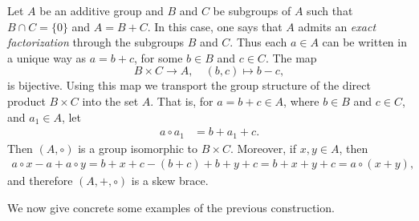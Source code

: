 \begin{example}
    \label{exa:WX}
    Let $A$ be an additive group
	and $B$ and $C$ be subgroups of $A$ such that $B\cap C=\{ 0\}$ and $A=B+C$. In this case, one says that $A$ admits an {\em exact factorization} through the subgroups $B$ and $C$.  Thus each $a\in A$ can be written in a unique
	way as $a=b+c$, for some $b\in B$ and $c\in C$.  The map
	\[
		B\times C\to A,\quad
		(b,c)\mapsto b-c,
	\]
	is bijective. Using this map we transport the group structure of the direct
	product $B\times C$ into the set $A$. That is, for $a=b+c\in A$, where $b\in B$ and $c\in C$, and
	$a_1\in A$, let 
	\begin{align*}
		a\circ a_1&=b+a_1+c.
	\end{align*}
	Then $(A,\circ)$ is a group isomorphic to $B\times C$. Moreover, if $x,y\in A$, 
	then 
	\begin{align*}
	a\circ x-a+a\circ y=b+x+c-(b+c)+b+y+c=b+x+y+c=a\circ (x+y),
	\end{align*}
	and therefore $(A,+,\circ)$ is a skew brace. 
\end{example}


We now give concrete some examples of the previous construction. 

